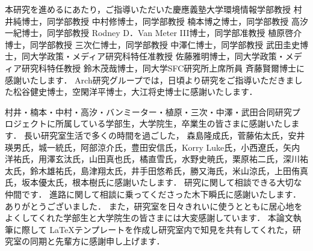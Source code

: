 
\begin{acknowledgment}

本研究を進めるにあたり，ご指導いただいた慶應義塾大学環境情報学部教授 村井純博士，同学部教授 中村修博士，同学部教授 楠本博之博士，同学部教授 高汐一紀博士，同学部教授 Rodney D．Van Meter III博士，同学部准教授 植原啓介博士，同学部教授 三次仁博士，同学部教授 中澤仁博士，同学部教授 武田圭史博士，同大学政策・メディア研究科特任准教授 佐藤雅明博士，同大学政策・メディア研究科特任教授 鈴木茂哉博士，同大学SFC研究所上席所員 斉藤賢爾博士に感謝いたします．
Arch研究グループでは，日頃より研究をご指導いただきました松谷健史博士，空閑洋平博士，大江将史博士に感謝いたします．

村井・楠本・中村・高汐・バンミーター・植原・三次・中澤・武田合同研究プロジェクトに所属している学部生，大学院生，卒業生の皆さまに感謝いたします．
長い研究室生活で多くの時間を過ごした，
森島隆成氏，菅藤佑太氏，安井瑛男氏，城一統氏，阿部涼介氏，豊田安信氏，Korry Luke氏，小西遼氏，矢内洋祐氏，用澤玄汰氏，山田真也氏，橘直雪氏，水野史暁氏，栗原祐二氏，深川祐太氏，鈴木雄祐氏，島津翔太氏，井手田悠希氏，勝又海氏，米山涼氏，上田侑真氏，坂本優太氏，根本樹氏に感謝いたします．
研究に関して相談できる大切な仲間です．
進路に関して相談に乗ってくださった木下瞬氏に感謝いたします．ありがとうございました．
また，研究室を日々きれいに使うとともに居心地をよくしてくれた学部生と大学院生の皆さまには大変感謝しています．
本論文執筆に際して \LaTeX テンプレートを作成し研究室内で知見を共有してくれた，研究室の同期と先輩方に感謝申し上げます．

\end{acknowledgment}
